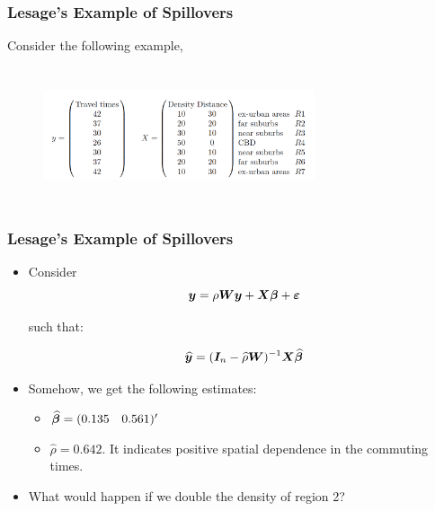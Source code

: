 \documentclass[english,10pt]{beamer}\usepackage[]{graphicx}\usepackage[]{xcolor}
\begin{document}
\begin{frame}
  \frametitle{Lesage's Example of Spillovers}
   Consider the following example,
     	\begin{figure}[H]
		    \centering 
		      \includegraphics[width = 8cm, height=4cm]{Lesage_ex2.png}
	    \end{figure}
\end{frame}

\begin{frame}
  \frametitle{Lesage's Example of Spillovers}
    \begin{itemize}
      \item Consider 
        \begin{equation}
          \bm y = \rho\bm W\bm y + \bm X\bm \beta + \bm {\varepsilon}
        \end{equation}
        
        such that:
        
        \begin{equation}
          \widehat{\bm y} = (\bm I_n - \widehat{\rho}\bm W)^{-1}\bm X\widehat{\bm \beta}
        \end{equation}
        
      \item Somehow, we get the following estimates:
        \begin{itemize}
          \item $\widehat{\bm \beta} = (0.135 \quad 0.561)'$
          \item $\widehat{\rho} = 0.642$. It indicates positive spatial dependence in the commuting times. 
        \end{itemize}
      \item What would happen if we double the density of region 2?  
    \end{itemize}
\end{frame}
\end{document}
